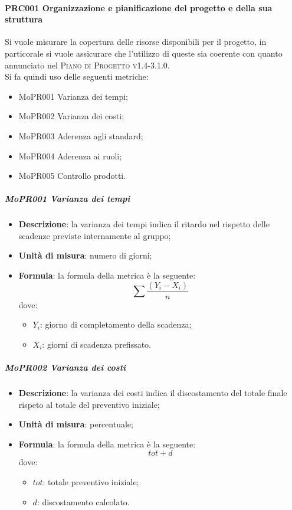 \documentclass[../norme-di-progetto.tex]{subfiles}
\begin{document}
\paragraph{PRC001 Organizzazione e pianificazione del progetto e della sua struttura}
Si vuole misurare la copertura delle risorse disponibili per il progetto, in particorale si vuole assicurare che l'utilizzo di queste sia coerente con quanto annunciato nel \textsc{Piano di Progetto v1.4-3.1.0}. \\
Si fa quindi uso delle seguenti metriche:
\begin{itemize}
  \item MoPR001 Varianza dei tempi;
  \item MoPR002 Varianza dei costi;
  \item MoPR003 Aderenza agli standard;
  \item MoPR004 Aderenza ai ruoli;
  \item MoPR005 Controllo prodotti.
\end{itemize}
\subparagraph{MoPR001 Varianza dei tempi}
\begin{itemize}
  \item \textbf{Descrizione}: la varianza dei tempi indica il ritardo nel rispetto delle scadenze previste internamente al gruppo;
  \item \textbf{Unità di misura}: numero di giorni;
  \item \textbf{Formula}: la formula della metrica è la seguente:
    \begin{displaymath}
    \sum \frac{(Y_i - X_i)}{n}
    \end{displaymath}
    dove:
    \begin{itemize}
      \item $ Y_i $: giorno di completamento della scadenza;
      \item $ X_i $: giorni di scadenza prefissato.
    \end{itemize}
\end{itemize}
\subparagraph{MoPR002 Varianza dei costi}
\begin{itemize}
  \item \textbf{Descrizione}: la varianza dei costi indica il discostamento del totale finale rispeto al totale del preventivo iniziale;
  \item \textbf{Unità di misura}: percentuale;
  \item \textbf{Formula}: la formula della metrica è la seguente:
  \begin{displaymath}
    tot + d
  \end{displaymath}
  dove:
  \begin{itemize}
    \item $ tot $: totale preventivo iniziale;
    \item $ d $: discostamento calcolato.
  \end{itemize}
\end{itemize}
\end{document}

